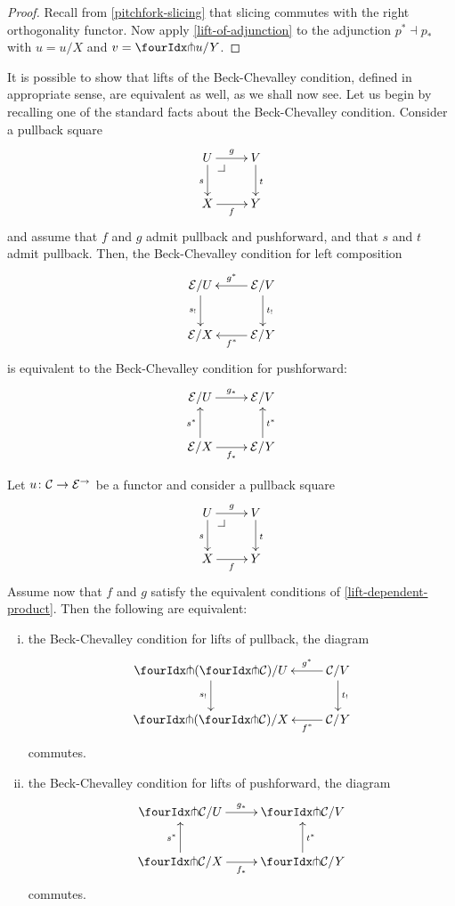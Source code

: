 \documentclass[reqno,10pt,a4paper,oneside]{amsart}
\begin{document}
\begin{proof}
Recall from \cref{pitchfork-slicing} that slicing commutes with the right orthogonality functor.
Now apply \cref{lift-of-adjunction} to the adjunction $p^* \dashv p_*$ with $u = u/X$ and $v = \liftr{u}/Y$.
\end{proof}

It is possible to show that lifts of the Beck-Chevalley condition, defined in appropriate sense, are equivalent as well, as we shall now see. Let us begin by recalling one of the standard facts about the Beck-Chevalley condition. Consider a
pullback square 
\[
\xymatrix{
  U
  \ar[d]_{s}
  \ar[r]^{g}
  \pullback{dr}
&
  V
  \ar[d]^{t}
\\
  X
  \ar[r]_{f}
&
  Y
}
\]
and assume that $f$ and $g$ admit pullback and pushforward, and that $s$ and $t$ admit pullback. Then,
 the Beck-Chevalley condition for left composition
\[
\xymatrix{
  \catE/U
  \ar[d]_{s_!}
&
  \catE/V
  \ar[l]_{g^*}
  \ar[d]^{t_!}
\\
  \catE/X
&
  \catE/Y
  \ar[l]^{f^*}
}
\]
is equivalent to the Beck-Chevalley condition for pushforward:
\[
\xymatrix{
  \catE/U
  \ar[r]^{g_*}
&
  \catE/V
\\
  \catE/X
  \ar[r]_{f_*}
  \ar[u]^{s^*}
&
  \catE/Y
  \ar[u]_{t^*}
}
\]





\begin{proposition}
\label{lift-pushforward-BC} Let $u \colon \mathcal{C} \to \mathcal{E}^{\to}$ be a functor and consider a 
pullback square
\[
\xymatrix{
  U
  \ar[d]_{s}
  \ar[r]^{g}
  \pullback{dr}
&
  V
  \ar[d]^{t}
\\
  X
  \ar[r]_{f}
&
  Y
}
\]
Assume now that $f$ and $g$ satisfy the equivalent conditions of \cref{lift-dependent-product}.
Then the following are equivalent:
\begin{enumerate}[(i)]
\item the Beck-Chevalley condition for lifts of pullback, \ie the diagram
\[
\xymatrix{
  \liftl{(\liftr{\cal{C}})}/U
  \ar[d]_{s_!}
&
  \cal{C}/V
  \ar[l]_-{g^*}
  \ar[d]^{t_!}
\\
  \liftl{(\liftr{\cal{C}})}/X
&
  \cal{C}/Y
  \ar[l]^-{f^*}
}
\]
commutes. 
\item the Beck-Chevalley  condition for lifts of pushforward, \ie the diagram
\[
\xymatrix{
  \liftr{\cal{C}}/U
  \ar[r]^{g_*}
&
  \liftr{\cal{C}}/V
\\
  \liftr{\cal{C}}/X
  \ar[r]_{f_*}
  \ar[u]^{s^*}
&
  \liftr{\cal{C}}/Y
  \ar[u]_{t^*}
}
\]
commutes.
\end{enumerate}
\end{proposition}
\end{document}

